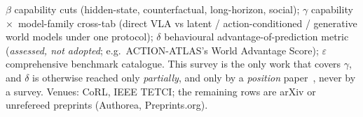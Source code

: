 \begin{table}[t]
{\textbf{$\beta$} capability cuts (hidden-state, counterfactual, long-horizon, social);
\textbf{$\gamma$} capability~$\times$~model-family cross-tab (direct VLA vs latent /
action-conditioned / generative world models under one protocol); \textbf{$\delta$} behavioural
advantage-of-prediction metric (\emph{assessed, not adopted}; e.g.\ ACTION-ATLAS's World Advantage
Score); \textbf{$\varepsilon$} comprehensive benchmark catalogue. This survey is the only work that
covers \textbf{$\gamma$}, and \textbf{$\delta$} is otherwise reached only \emph{partially}, and only
by a \emph{position} paper~\cite{pos_yangyu}, never by a survey. Venues: CoRL, IEEE TETCI; the
remaining rows are arXiv or unrefereed preprints (Authorea, Preprints.org).}
\label{tab:survey_compare}
\end{table}
